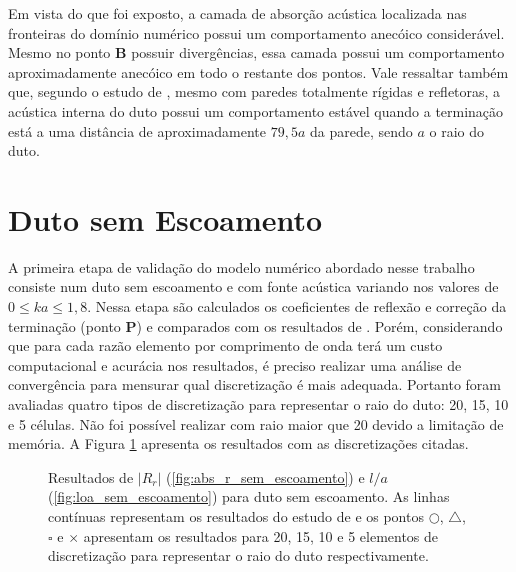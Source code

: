 Em vista do que foi exposto, a camada de absorção acústica localizada nas fronteiras do domínio numérico
 possui um comportamento anecóico considerável. Mesmo no ponto \textbf{B} possuir divergências, 
 essa camada possui um comportamento aproximadamente anecóico em todo o restante dos pontos.
 Vale ressaltar também que, segundo o estudo de , 
 mesmo com paredes totalmente rígidas e refletoras, a acústica interna do duto possui 
 um comportamento estável quando a terminação está a uma distância de aproximadamente $79,5a$ da parede, sendo $a$ o raio do duto.  

\section{Duto sem Escoamento}

A primeira etapa de validação do modelo numérico abordado nesse trabalho consiste num duto sem escoamento e com fonte acústica variando nos valores de $0 \leq ka \leq 1,8$. Nessa etapa são calculados os coeficientes de reflexão e correção da terminação (ponto \textbf{P}) e comparados com os resultados de . Porém, considerando que para cada razão elemento por comprimento de onda terá um custo computacional e acurácia nos resultados, é preciso realizar uma análise de convergência para mensurar qual discretização é mais adequada. Portanto foram avaliadas quatro tipos de discretização para representar o raio do duto: 20, 15, 10 e 5 células. Não foi possível realizar com raio maior que 20 devido a limitação de memória. A Figura \ref{fig:resultados_sem_escoamento} apresenta os resultados com as discretizações citadas.

\begin{figure}[h!]
\begin{subfigure}{\scaleA \textwidth}
  
\end{subfigure}%
\begin{subfigure}{\scaleA \textwidth}
  
\end{subfigure}
\caption[Resultados de $|R_{r}|$ e $l/a$ sem escoamento]{Resultados de $|R_{r}|$ (\ref{fig:abs_r_sem_escoamento}) e $l/a$ (\ref{fig:loa_sem_escoamento}) para duto sem escoamento. As linhas contínuas representam os resultados do estudo de  e os pontos $\bigcirc$, $\bigtriangleup$, $\square$ e $\times$ apresentam os resultados para 20, 15, 10 e 5 elementos de discretização para representar o raio do duto respectivamente.}
\label{fig:resultados_sem_escoamento}
\end{figure}

